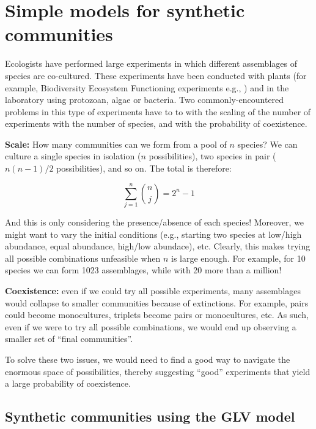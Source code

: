 \documentclass[]{book}
\begin{document}
\hypertarget{data}{%
\chapter{Simple models for synthetic communities}\label{data}}

Ecologists have performed large experiments in which different assemblages of species are co-cultured. These experiments have been conducted with plants (for example, Biodiversity Ecosystem Functioning experiments e.g., \citep{hector1999plant} \citep{tilman2001diversity} \citep{cadotte2013experimental}) and in the laboratory using protozoan, algae or bacteria. Two commonly-encountered problems in this type of experiments have to to with the scaling of the number of experiments with the number of species, and with the probability of coexistence.

\textbf{Scale:} How many communities can we form from a pool of \(n\) species? We can culture a single species in isolation (\(n\) possibilities), two species in pair (\(n(n-1) / 2\) possibilities), and so on. The total is therefore:

\[
\sum_{j=1}^n \binom{n}{j} = 2^n -1
\]

And this is only considering the presence/absence of each species! Moreover, we might want to vary the initial conditions (e.g., starting two species at low/high abundance, equal abundance, high/low abundace), etc. Clearly, this makes trying all possible combinations unfeasible when \(n\) is large enough. For example, for 10 species we can form 1023 assemblages, while with 20 more than a million!

\textbf{Coexistence:} even if we could try all possible experiments, many assemblages would collapse to smaller communities because of extinctions. For example, pairs could become monocultures, triplets become pairs or monocultures, etc. As such, even if we were to try all possible combinations, we would end up observing a smaller set of ``final communities''.

To solve these two issues, we would need to find a good way to navigate the enormous space of possibilities, thereby suggesting ``good'' experiments that yield a large probability of coexistence.

\hypertarget{synthetic-communities-using-the-glv-model}{%
\section{Synthetic communities using the GLV model}\label{synthetic-communities-using-the-glv-model}}
\end{document}
